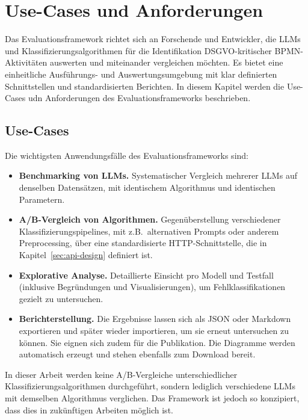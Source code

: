 \section{Use-Cases und Anforderungen}\label{sec:anforderungen-und-use-cases}

Das Evaluationsframework richtet sich an Forschende und Entwickler, die \acp{LLM} und Klassifizierungsalgorithmen für die Identifikation \ac{DSGVO}-kritischer \ac{BPMN}-Aktivitäten auswerten und miteinander vergleichen möchten. Es bietet eine einheitliche Ausführungs- und Auswertungsumgebung mit klar definierten Schnittstellen und standardisierten Berichten. In diesem Kapitel werden die Use-Cases udn Anforderungen des Evaluationsframeworks beschrieben.

\subsection*{Use-Cases}

Die wichtigsten Anwendungsfälle des Evaluationsframeworks sind:

\begin{itemize}
    \item \textbf{Benchmarking von LLMs.} Systematischer Vergleich mehrerer \acp{LLM} auf denselben Datensätzen, mit identischem Algorithmus und identischen Parametern.
    \item \textbf{A/B-Vergleich von Algorithmen.} Gegenüberstellung verschiedener Klassifizierungspipelines, mit z.B.\ alternativen Prompts oder anderem Preprocessing, über eine standardisierte HTTP-Schnittstelle, die in Kapitel~\ref{sec:api-design} definiert ist.
    \item \textbf{Explorative Analyse.} Detaillierte Einsicht pro Modell und Testfall (inklusive Begründungen und Visualisierungen), um Fehlklassifikationen gezielt zu untersuchen.
    \item \textbf{Berichterstellung.} Die Ergebnisse lassen sich als JSON oder Markdown exportieren und später wieder importieren, um sie erneut untersuchen zu können. Sie eignen sich zudem für die Publikation. Die Diagramme werden automatisch erzeugt und stehen ebenfalls zum Download bereit.
\end{itemize}

In dieser Arbeit werden keine A/B-Vergleiche unterschiedlicher Klassifizierungsalgorithmen durchgeführt, sondern lediglich verschiedene \acp{LLM} mit demselben Algorithmus verglichen. Das Framework ist jedoch so konzipiert, dass dies in zukünftigen Arbeiten möglich ist.

